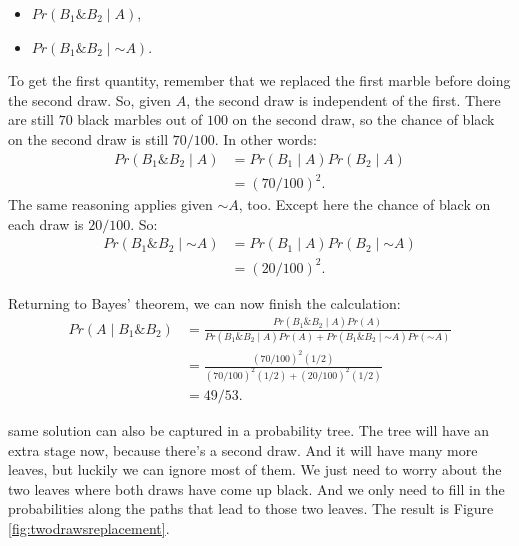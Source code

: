 \documentclass[justified]{tufte-book}
\providecommand{\tightlist}{%
  \setlength{\itemsep}{0pt}\setlength{\parskip}{0pt}}
\newcommand{\given}{\mid}
\renewcommand{\neg}{\mathbin{\sim}}
\renewcommand{\wedge}{\mathbin{\&}}
\newcommand{\p}{Pr}
\theoremstyle{definition}
\theoremstyle{definition}
\theoremstyle{definition}
\theoremstyle{remark}
\begin{document}
\begin{itemize}
\tightlist
\item
  \(\p(B_1 \wedge B_2 \given A)\),
\item
  \(\p(B_1 \wedge B_2 \given \neg A)\).
\end{itemize}

To get the first quantity, remember that we replaced the first marble
before doing the second draw. So, given \(A\), the second draw is
independent of the first. There are still \(70\) black marbles out of
\(100\) on the second draw, so the chance of black on the second draw is
still \(70/100\). In other words: \[
  \begin{aligned}
    \p(B_1 \wedge B_2 \given A) &= \p(B_1 \given A) \p(B_2 \given A)\\
      &= (70/100)^2.
  \end{aligned}
\] The same reasoning applies given \(\neg A\), too. Except here the
chance of black on each draw is \(20/100\). So: \[
  \begin{aligned}
    \p(B_1 \wedge B_2 \given \neg A) &= \p(B_1 \given A) \p(B_2 \given \neg A)\\
      &= (20/100)^2.
  \end{aligned}
\]

Returning to Bayes' theorem, we can now finish the calculation: \[
  \begin{aligned}
    \p(A \given B_1 \wedge B_2) &= \frac{\p(B_1 \wedge B_2 \given A)\p(A)}{\p(B_1 \wedge B_2 \given A) \p(A) + \p(B_1 \wedge B_2 \given \neg A) \p(\neg A)} \\ 
    &= \frac{(70/100)^2(1/2)}{(70/100)^2(1/2) + (20/100)^2(1/2)}\\
    &= 49/53.
  \end{aligned}
\]

 same solution can also be captured in a probability
tree. The tree will have an extra stage now, because there's a second
draw. And it will have many more leaves, but luckily we can ignore most
of them. We just need to worry about the two leaves where both draws
have come up black. And we only need to fill in the probabilities along
the paths that lead to those two leaves. The result is Figure
\ref{fig:twodrawsreplacement}.
\end{document}

